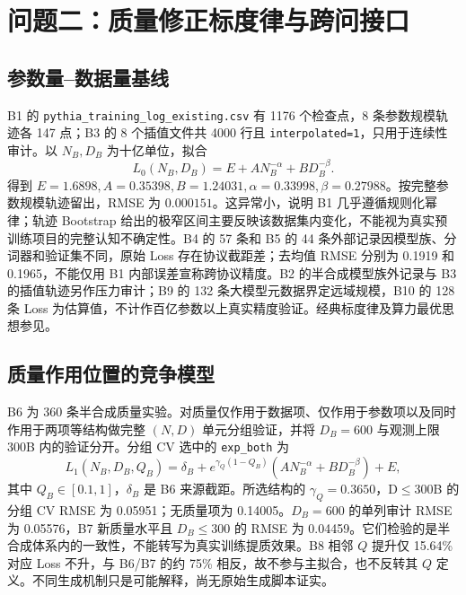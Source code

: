 \section{问题二：质量修正标度律与跨问接口}
\subsection{参数量--数据量基线}
B1 的 \texttt{pythia\_training\_log\_existing.csv} 有 1176 个检查点，8 条参数规模轨迹各 147 点；B3 的 8 个插值文件共 4000 行且 \texttt{interpolated=1}，只用于连续性审计。以 $N_B,D_B$ 为十亿单位，拟合
\begin{equation}
L_0(N_B,D_B)=E+A N_B^{-\alpha}+B D_B^{-\beta}.
\end{equation}
得到 $E=1.6898,A=0.35398,B=1.24031,\alpha=0.33998,\beta=0.27988$。按完整参数规模轨迹留出，RMSE 为 $0.000151$。这异常小，说明 B1 几乎遵循规则化幂律；轨迹 Bootstrap 给出的极窄区间主要反映该数据集内变化，不能视为真实预训练项目的完整认知不确定性。B4 的 57 条和 B5 的 44 条外部记录因模型族、分词器和验证集不同，原始 Loss 存在协议截距差；去均值 RMSE 分别为 0.1919 和 0.1965，不能仅用 B1 内部误差宣称跨协议精度。B2 的半合成模型族外记录与 B3 的插值轨迹另作压力审计；B9 的 132 条大模型元数据界定远域规模，B10 的 128 条 Loss 为估算值，不计作百亿参数以上真实精度验证。经典标度律及算力最优思想参见\cite{kaplan,hoffmann}。

\subsection{质量作用位置的竞争模型}
B6 为 360 条半合成质量实验。对质量仅作用于数据项、仅作用于参数项以及同时作用于两项等结构做完整 $(N,D)$ 单元分组验证，并将 $D_B=600$ 与观测上限 300B 内的验证分开。分组 CV 选中的 \texttt{exp\_both} 为
\begin{equation}
L_1(N_B,D_B,Q_B)=\delta_B+
e^{\gamma_Q(1-Q_B)}
\left(A N_B^{-\alpha}+B D_B^{-\beta}\right)+E,
\label{eq:m1}
\end{equation}
其中 $Q_B\in[0.1,1]$，$\delta_B$ 是 B6 来源截距。所选结构的 $\gamma_Q=0.3650$，D$\leq$300B 的分组 CV RMSE 为 0.05951；无质量项为 0.14005。$D_B=600$ 的单列审计 RMSE 为 0.05576，B7 新质量水平且 $D_B\leq300$ 的 RMSE 为 0.04459。它们检验的是半合成体系内的一致性，不能转写为真实训练提质效果。B8 相邻 $Q$ 提升仅 15.64\% 对应 Loss 不升，与 B6/B7 的约 75\% 相反，故不参与主拟合，也不反转其 $Q$ 定义。不同生成机制只是可能解释，尚无原始生成脚本证实。

